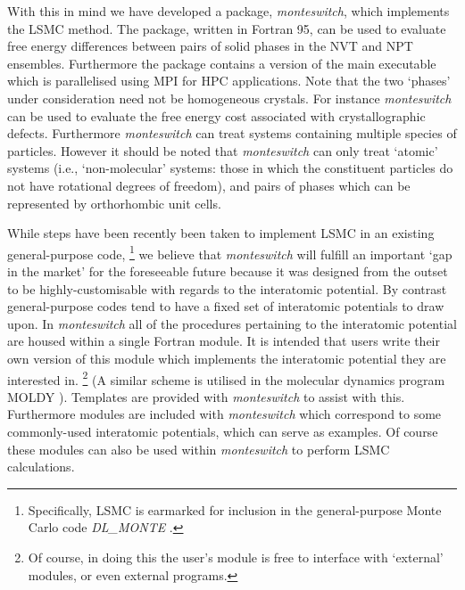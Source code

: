 \documentclass{report}
\begin{document}
With this in mind we have developed a package, \emph{monteswitch}, which implements the LSMC method. The package, written in Fortran 95, can
be used to evaluate free energy differences between pairs of solid phases in the NVT and NPT ensembles. Furthermore the
package contains a version of the main executable which is parallelised using MPI for HPC applications.
Note that the two `phases' under consideration need not be homogeneous crystals. For instance \emph{monteswitch} can be used to evaluate the
free energy cost associated with crystallographic defects. Furthermore \emph{monteswitch} can treat systems containing multiple species of particles.
However it should be noted that \emph{monteswitch} can only treat `atomic' systems (i.e., `non-molecular' systems: those in which the constituent
particles do not have rotational degrees of freedom), and pairs of phases which can be represented by orthorhombic unit cells.

While steps have been recently been taken to implement LSMC in an existing general-purpose code,
\footnote{Specifically, LSMC is earmarked for inclusion in the general-purpose Monte Carlo code \emph{DL\_MONTE} \cite{Purton_2013}.}
we believe that \emph{monteswitch} will fulfill an important `gap in the market' for the foreseeable future because it was designed from 
the outset to be highly-customisable with regards to the interatomic potential. By contrast general-purpose codes tend to have a fixed set 
of interatomic potentials to draw upon.
In \emph{monteswitch} all of the procedures pertaining to the interatomic potential are housed within a single Fortran module. 
It is intended that users write their own version of this module which implements the interatomic potential they are 
interested in.
\footnote{Of course, in doing this the user's module is free to interface with `external' modules, or even external programs.}
(A similar scheme is utilised in the molecular dynamics program MOLDY \cite{Ackland_2011}). 
Templates are provided with \emph{monteswitch} to assist with this. Furthermore modules are included
with \emph{monteswitch} which correspond to some commonly-used interatomic potentials, which can serve as examples. Of course these modules can also be
used within \emph{monteswitch} to perform LSMC calculations.
\end{document}
